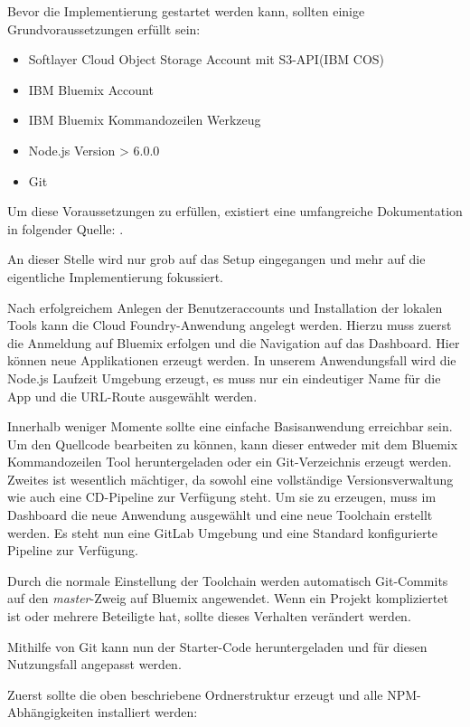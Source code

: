 Bevor die Implementierung gestartet werden kann, sollten einige Grundvoraussetzungen erfüllt sein:

\begin{itemize}
	\item Softlayer Cloud Object Storage Account mit S3-API(IBM COS)
	\item IBM Bluemix Account
	\item IBM Bluemix Kommandozeilen Werkzeug
	\item Node.js Version > 6.0.0
	\item \gls{Git}
\end{itemize}

Um diese Voraussetzungen zu erfüllen, existiert eine umfangreiche Dokumentation in folgender Quelle: \cite[S. 129]{Rios.2017}.

An dieser Stelle wird nur grob auf das Setup eingegangen und mehr auf die eigentliche Implementierung fokussiert.

Nach erfolgreichem Anlegen der Benutzeraccounts und Installation der lokalen Tools kann die Cloud Foundry-Anwendung angelegt werden. Hierzu muss zuerst die Anmeldung auf Bluemix erfolgen und die Navigation auf das Dashboard. Hier können neue Applikationen erzeugt werden. In unserem Anwendungsfall wird die Node.js Laufzeit Umgebung erzeugt, es muss nur ein eindeutiger Name für die App und die URL-Route ausgewählt werden.

Innerhalb weniger Momente sollte eine einfache Basisanwendung erreichbar sein. Um den Quellcode bearbeiten zu können, kann dieser entweder mit dem Bluemix Kommandozeilen Tool heruntergeladen oder ein Git-Verzeichnis erzeugt werden. Zweites ist wesentlich mächtiger, da sowohl eine vollständige Versionsverwaltung wie auch eine \ac{CD}-Pipeline zur Verfügung steht. Um sie zu erzeugen, muss im Dashboard die neue Anwendung ausgewählt und eine neue Toolchain erstellt werden. Es steht nun eine GitLab Umgebung und eine Standard konfigurierte Pipeline zur Verfügung.

Durch die normale Einstellung der Toolchain werden automatisch Git-Commits auf den \textit{master}-Zweig auf Bluemix angewendet. Wenn ein Projekt kompliziertet ist oder mehrere Beteiligte hat, sollte dieses Verhalten verändert werden.

Mithilfe von \gls{Git} kann nun der Starter-Code heruntergeladen und für diesen Nutzungsfall angepasst werden.

Zuerst sollte die oben beschriebene Ordnerstruktur erzeugt und alle NPM-Abhängigkeiten installiert werden:

